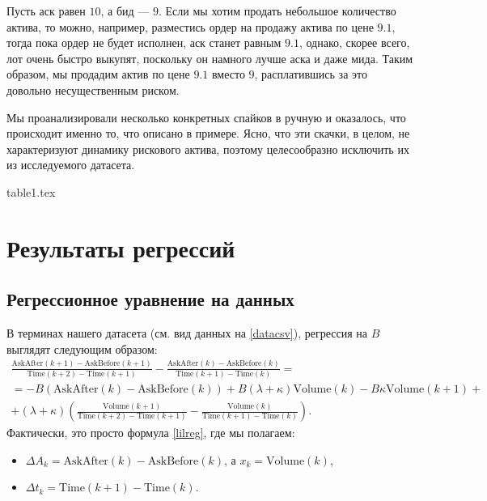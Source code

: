 \begin{example}
    Пусть аск равен $10$, а бид --- $9$. Если мы хотим продать небольшое количество актива, то можно, например, разместись ордер
    на продажу актива по цене $9.1$, тогда пока ордер не будет исполнен, аск станет равным $9.1$, однако, скорее всего, лот очень
    быстро выкупят, поскольку он намного лучше аска и даже мида. Таким образом, мы продадим актив по цене $9.1$ вместо $9$, 
    расплатившись за это довольно несущественным риском.
\end{example}

Мы проанализировали несколько конкретных спайков в ручную и оказалось, что происходит именно то, что описано в примере. 
Ясно, что эти скачки, в целом, не характеризуют
динамику рискового актива, поэтому целесообразно исключить их из исследуемого датасета. \par


{table1.tex}



\section{Результаты регрессий} \label{rowregr}

\subsection{Регрессионное уравнение на данных}
\par
В терминах нашего датасета (см. вид данных на \ref{datacsv}), регрессия на $B$ выглядят следующим образом:
\begin{align*}
\frac{\textrm{AskAfter}(k+1) - \textrm{AskBefore}(k+1)}{\textrm{Time}(k+2) - \textrm{Time}(k+1)} 
- \frac{\textrm{AskAfter}(k) - \textrm{AskBefore}(k)}{\textrm{Time}(k+1) - \textrm{Time}(k)}
= \\ 
= -B (\textrm{AskAfter}(k) - \textrm{AskBefore}(k)) + B (\lambda + \kappa) \textrm{Volume}(k) 
- B \kappa \textrm{Volume}(k+1) + \\
+ (\lambda + \kappa) \left(\frac{\textrm{Volume}(k+1)}{\textrm{Time}(k+2) - \textrm{Time}(k+1)} 
- \frac{\textrm{Volume}(k)}{\textrm{Time}(k+1) - \textrm{Time}(k)}\right).
\end{align*}
Фактически, это просто формула \eqref{lilreg}, где мы полагаем:
\begin{itemize}
    \item $\Delta A_{k} = \textrm{AskAfter}(k) - \textrm{AskBefore}(k)$, а $x_k = \textrm{Volume}(k)$,
    \item $\Delta t_{k} = \textrm{Time}(k+1) - \textrm{Time}(k)$.
\end{itemize}
\par

